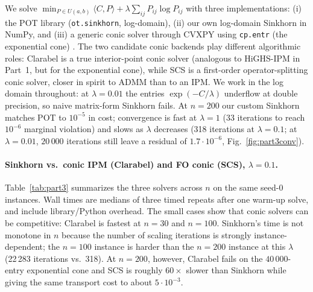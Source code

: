 \documentclass{article}
\begin{document}
We solve $\min_{P\in U(a,b)}\langle C,P\rangle + \lambda\sum_{ij}P_{ij}\log P_{ij}$
with three implementations: (i) the POT library
(\texttt{ot.sinkhorn}, log-domain), (ii) our own log-domain Sinkhorn in
NumPy, and (iii) a generic conic solver through CVXPY using
\texttt{cp.entr} (the exponential cone)
\cite{cuturi2013sinkhorn,peyre2019computational}.  The two candidate
conic backends play different algorithmic roles: Clarabel is a true
interior-point conic solver (analogous to HiGHS-IPM in Part~1, but for
the exponential cone), while SCS is a first-order operator-splitting
conic solver, closer in spirit to ADMM than to an IPM.
We work in the log domain throughout: at $\lambda\!=\!0.01$ the entries
$\exp(-C/\lambda)$ underflow at double precision, so naive
matrix-form Sinkhorn fails.  At $n\!=\!200$ our custom Sinkhorn
matches POT to $10^{-5}$ in cost; convergence is fast at $\lambda\!=\!1$
(33 iterations to reach $10^{-6}$ marginal violation) and slows as
$\lambda$ decreases (318 iterations at $\lambda\!=\!0.1$; at
$\lambda\!=\!0.01$, $20\,000$ iterations still leave a residual of
$1.7\!\cdot\!10^{-6}$, Fig.~\ref{fig:part3conv}).

\paragraph{Sinkhorn vs.\ conic IPM (Clarabel) and FO conic (SCS), $\lambda\!=\!0.1$.}
Table~\ref{tab:part3} summarizes the three solvers across $n$ on the
same seed-0 instances.  Wall times are medians of three timed repeats
after one warm-up solve, and include library/Python overhead.  The
small cases show that conic solvers can be competitive: Clarabel is
fastest at $n\!=\!30$ and $n\!=\!100$.  Sinkhorn's time is not monotone
in $n$ because the number of scaling iterations is strongly
instance-dependent; the $n\!=\!100$ instance is harder than the
$n\!=\!200$ instance at this $\lambda$ (22\,283 iterations vs.\ 318).
At $n\!=\!200$, however,
Clarabel fails on the $40\,000$-entry exponential cone and SCS is
roughly $60\times$ slower than Sinkhorn while giving the same transport
cost to about $5\!\cdot\!10^{-3}$.
\end{document}
